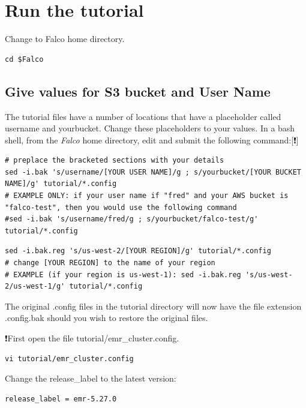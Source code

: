 \documentclass[
]{book}
\begin{document}
\hypertarget{run-the-tutorial}{%
\chapter{Run the tutorial}\label{run-the-tutorial}}

Change to Falco home directory.

\begin{verbatim}
cd $Falco
\end{verbatim}

\hypertarget{give-values-for-s3-bucket-and-user-name}{%
\section{Give values for S3 bucket and User Name}\label{give-values-for-s3-bucket-and-user-name}}

The tutorial files have a number of locations that have a placeholder called username and yourbucket. Change these placeholders to your values. In a bash shell, from the \emph{Falco} home directory, edit and submit the following command:{[}❗️{]}

\begin{verbatim}
# preplace the bracketed sections with your details
sed -i.bak 's/username/[YOUR USER NAME]/g ; s/yourbucket/[YOUR BUCKET NAME]/g' tutorial/*.config
# EXAMPLE ONLY: if your user name if "fred" and your AWS bucket is "falco-test", then you would use the following command
#sed -i.bak 's/username/fred/g ; s/yourbucket/falco-test/g' tutorial/*.config
\end{verbatim}

\begin{verbatim}
sed -i.bak.reg 's/us-west-2/[YOUR REGION]/g' tutorial/*.config
# change [YOUR REGION] to the name of your region
# EXAMPLE (if your region is us-west-1): sed -i.bak.reg 's/us-west-2/us-west-1/g' tutorial/*.config
\end{verbatim}

The original .config files in the tutorial directory will now have the file extension .config.bak should you wish to restore the original files.

❗First open the file tutorial/emr\_cluster.config.

\begin{verbatim}
vi tutorial/emr_cluster.config
\end{verbatim}

Change the release\_label to the latest version:

\begin{verbatim}
release_label = emr-5.27.0
\end{verbatim}
\end{document}
